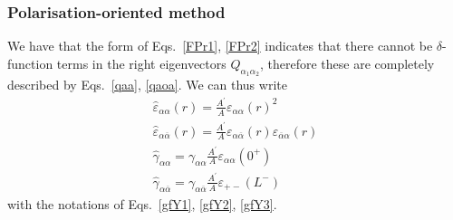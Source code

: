 \documentclass[pre,aps,superscriptaddress,nofootinbib]{revtex4}
\begin{document}

\subsubsection{Polarisation-oriented method}

We have that the form of Eqs.~\ref{FPr1}, \ref{FPr2} indicates that there cannot be $\delta$-function terms in the right eigenvectors $Q_{\alpha_1\alpha_2}$, therefore these are completely described by Eqs.~\ref{qaa}, \ref{qaoa}. We can thus write
\begin{eqnarray}
\hat{\varepsilon}_{\alpha\alpha}(r) = \frac{A^{\prime}}{A} \varepsilon_{\alpha\alpha}(r)^2\\
\hat{\varepsilon}_{\alpha\overline{\alpha}}(r) = \frac{A^{\prime}}{A} \varepsilon_{\alpha\overline{\alpha}}(r) \varepsilon_{\overline{\alpha}\alpha}(r)\\
\hat{\gamma}_{\alpha\alpha} = \gamma_{\alpha\alpha} \frac{A^{\prime}}{A} \varepsilon_{\alpha\alpha}(0^+)\\
\hat{\gamma}_{\alpha\overline{\alpha}} = \gamma_{\alpha\overline{\alpha}} \frac{A^{\prime}}{A} \varepsilon_{+-}(L^-)
\end{eqnarray}
with the notations of Eqs.~\ref{gfY1}, \ref{gfY2}, \ref{gfY3}.\\
\end{document}
